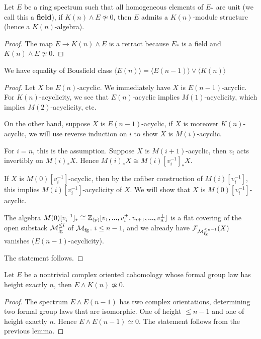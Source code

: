 \begin{corollary}
    Let $E$ be a ring spectrum such that all homogeneous elements of $E_*$ are unit (we call this a \textbf{field}), if $K(n)\wedge E\not \simeq 0$, then $E$ admits a $K(n)$-module structure (hence a $K(n)$-algebra).
\end{corollary}
\begin{proof}
    The map $E\to K(n)\wedge E$ is a retract because $E_*$ is a field and $ K(n)\wedge E\not \simeq 0$.
\end{proof}

\begin{lemma}
    We have equality of Bousfield class $\langle E(n)\rangle=\langle E(n-1)\rangle\vee \langle K(n)\rangle$
\end{lemma}
\begin{proof}
    Let $X$ be $E(n)$-acyclic. We immediately have $X$ is $E(n-1)$-acyclic. For $K(n)$-acyclicity, we see that $E(n)$-acyclic implies $M(1)$-acyclicity, which implies 
    $M(2)$-acyclicity, etc. 

    On the other hand, suppose $X$ is $E(n-1)$-acyclic, if $X$ is moreover $K(n)$-acyclic, we will use reverse induction on $i$ to show
    $X$ is $M(i)$-acyclic.

    For $i=n$, this is the assumption. Suppose $X$ is $M(i+1)$-acyclic, then $v_i$ acts invertibly on $M(i)_*X$. Hence $M(i)_*X\cong M(i)[v_i^{-1}]_*X$. 
    
    If $X$ is $M(0)[v_i^{-1}]$-acyclic, then by the cofiber construction of $M(i)[v_i^{-1}]$, this implies $M(i)[v_i^{-1}]$-acyclicity of $X$. We will show that
    $X$ is $M(0)[v_i^{-1}]$-acyclic.

    The algebra $M(0)[v_i^{-1}]_*\cong \mathbb{Z}_{(p)}[v_1,...,v_i^{\pm}, v_{i+1},...,v_n^{\pm}]$ is a flat covering of the open substack $\mathcal{M}_{\mathrm{fg}}^{\leq i}$ of $\mathcal{M}_{\mathrm{fg}}$. $i\leq n-1$, and we already have $\mathcal{F}_{\mathcal{M}_{\mathrm{fg}}^{\leq n-1}}(X)$ vanishes ($E(n-1)$-acyclicity).

    The statement follows.
\end{proof}

\begin{proposition}
    Let $E$ be a nontrivial complex oriented cohomology whose formal group law has height exactly $n$, then $E\wedge K(n)\not \simeq 0$.
\end{proposition}

\begin{proof}
    The spectrum $E\wedge E(n-1)$ has two complex orientations, determining two formal group laws that are isomorphic. One of height $\leq n-1$ and one of height exactly $n$. Hence $E\wedge E(n-1)\simeq 0$. 
    The statement follows from the previous lemma.
\end{proof}

